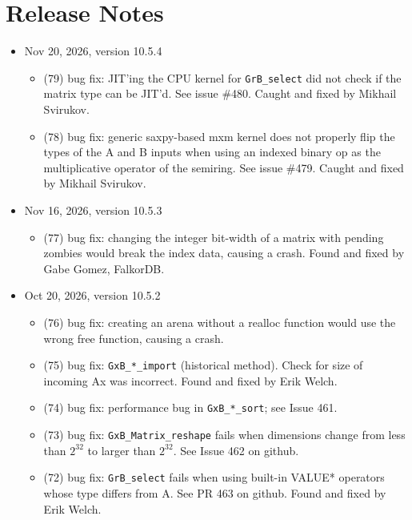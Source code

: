 
\section{Release Notes}

\begin{itemize}

\item Nov 20, 2026, version 10.5.4

    \begin{itemize}
    \item (79) bug fix: JIT'ing the CPU kernel for \verb'GrB_select'
        did not check if the matrix type can be JIT'd.
        See issue \#480.  Caught and fixed by Mikhail Svirukov.
    \item (78) bug fix: generic saxpy-based mxm kernel does not properly
        flip the types of the A and B inputs when using an indexed binary op as
        the multiplicative operator of the semiring.
        See issue \#479.  Caught and fixed by Mikhail Svirukov.
    \end{itemize}

\item Nov 16, 2026, version 10.5.3

    \begin{itemize}
    \item (77) bug fix: changing the integer bit-width of a matrix with pending
        zombies would break the index data, causing a crash.
        Found and fixed by Gabe Gomez, FalkorDB.
    \end{itemize}

\item Oct 20, 2026, version 10.5.2

    \begin{itemize}
    \item (76) bug fix: creating an arena without a realloc function would
        use the wrong free function, causing a crash.
    \item (75) bug fix: \verb'GxB_*_import' (historical method).  Check for
        size of incoming Ax was incorrect.  Found and fixed by Erik Welch.
    \item (74) bug fix: performance bug in \verb'GxB_*_sort'; see Issue 461.
    \item (73) bug fix: \verb'GxB_Matrix_reshape' fails when dimensions change
        from less than $2^{32}$ to larger than $2^{32}$.  See Issue 462 on
        github.
    \item (72) bug fix: \verb'GrB_select' fails when using built-in VALUE*
        operators whose type differs from A.  See PR 463 on github.
        Found and fixed by Erik Welch.
    \end{itemize}


\end{itemize}
